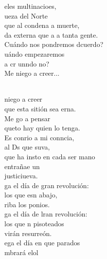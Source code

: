 \begin{cancion}
	eles multinacioes,\\
	ueza del Norte\\
	que al  condena a muerte,\\
	da externa que a a tanta gente.\\
	Cuándo nos pondremos dcuerdo?\\
	uándo empezaremos\\
	a cr unndo no?  \\
Me niego a creer...\\
	\jumjump\\
	\begin{chorus}%
		 niego a creer\\
		que esta sitión sea erna.\\
		Me go a pensar \\
		queto hay quien lo tenga.\\
		Es conrio a mi conncia,\\
		al Ds que suva,\\
		que ha insto en cada ser mano\\
		entrañae un\\
		justiciueva.   \\
	\jump
		ga el día de gran revolución:\\
		los que esn abajo,  \\
		riba los ponios.\\
		ga el día de lran revolución:\\
		los que n pisoteados \\
		virán resurreón.\\
	\jump
		ega el día en que parados\\
		mbrará elol\jump\\
	\end{chorus}%
\end{cancion}%
